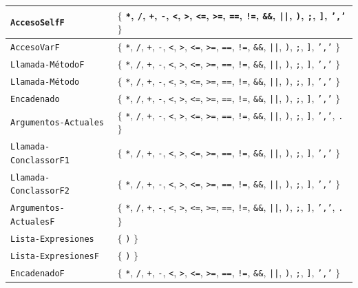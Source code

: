 \begin{longtable}{|
>{\raggedright\arraybackslash}p{}|
>{\raggedright\arraybackslash}p{}|}
\texttt{AccesoSelfF} & \(\{\) \texttt{*}, \texttt{/}, \texttt{+}, \texttt{-}, \texttt{<}, \texttt{>}, \texttt{<=}, \texttt{>=}, \texttt{==}, \texttt{!=}, \texttt{\&\&}, \texttt{||}, \texttt{)}, \texttt{;}, \texttt{]}, \texttt{','} \(\}\) \\ \hline
\texttt{AccesoVarF} & \(\{\) \texttt{*}, \texttt{/}, \texttt{+}, \texttt{-}, \texttt{<}, \texttt{>}, \texttt{<=}, \texttt{>=}, \texttt{==}, \texttt{!=}, \texttt{\&\&}, \texttt{||}, \texttt{)}, \texttt{;}, \texttt{]}, \texttt{','} \(\}\) \\ \hline
\texttt{Llamada-MétodoF} & \(\{\) \texttt{*}, \texttt{/}, \texttt{+}, \texttt{-}, \texttt{<}, \texttt{>}, \texttt{<=}, \texttt{>=}, \texttt{==}, \texttt{!=}, \texttt{\&\&}, \texttt{||}, \texttt{)}, \texttt{;}, \texttt{]}, \texttt{','} \(\}\) \\ \hline
\texttt{Llamada-Método} & \(\{\) \texttt{*}, \texttt{/}, \texttt{+}, \texttt{-}, \texttt{<}, \texttt{>}, \texttt{<=}, \texttt{>=}, \texttt{==}, \texttt{!=}, \texttt{\&\&}, \texttt{||}, \texttt{)}, \texttt{;}, \texttt{]}, \texttt{','} \(\}\) \\ \hline
\texttt{Encadenado} & \(\{\) \texttt{*}, \texttt{/}, \texttt{+}, \texttt{-}, \texttt{<}, \texttt{>}, \texttt{<=}, \texttt{>=}, \texttt{==}, \texttt{!=}, \texttt{\&\&}, \texttt{||}, \texttt{)}, \texttt{;}, \texttt{]}, \texttt{','} \(\}\) \\ \hline
\texttt{Argumentos-Actuales} & \(\{\) \texttt{*}, \texttt{/}, \texttt{+}, \texttt{-}, \texttt{<}, \texttt{>}, \texttt{<=}, \texttt{>=}, \texttt{==}, \texttt{!=}, \texttt{\&\&}, \texttt{||}, \texttt{)}, \texttt{;}, \texttt{]}, \texttt{','}, \texttt{.} \(\}\) \\ \hline
\texttt{Llamada-ConclassorF1} & \(\{\) \texttt{*}, \texttt{/}, \texttt{+}, \texttt{-}, \texttt{<}, \texttt{>}, \texttt{<=}, \texttt{>=}, \texttt{==}, \texttt{!=}, \texttt{\&\&}, \texttt{||}, \texttt{)}, \texttt{;}, \texttt{]}, \texttt{','} \(\}\) \\ \hline
\texttt{Llamada-ConclassorF2} & \(\{\) \texttt{*}, \texttt{/}, \texttt{+}, \texttt{-}, \texttt{<}, \texttt{>}, \texttt{<=}, \texttt{>=}, \texttt{==}, \texttt{!=}, \texttt{\&\&}, \texttt{||}, \texttt{)}, \texttt{;}, \texttt{]}, \texttt{','} \(\}\) \\ \hline
\texttt{Argumentos-ActualesF} & \(\{\) \texttt{*}, \texttt{/}, \texttt{+}, \texttt{-}, \texttt{<}, \texttt{>}, \texttt{<=}, \texttt{>=}, \texttt{==}, \texttt{!=}, \texttt{\&\&}, \texttt{||}, \texttt{)}, \texttt{;}, \texttt{]}, \texttt{','}, \texttt{.} \(\}\) \\ \hline
\texttt{Lista-Expresiones} & \(\{\) \texttt{)} \(\}\) \\ \hline
\texttt{Lista-ExpresionesF} & \(\{\) \texttt{)} \(\}\) \\ \hline
\texttt{EncadenadoF} & \(\{\) \texttt{*}, \texttt{/}, \texttt{+}, \texttt{-}, \texttt{<}, \texttt{>}, \texttt{<=}, \texttt{>=}, \texttt{==}, \texttt{!=}, \texttt{\&\&}, \texttt{||}, \texttt{)}, \texttt{;}, \texttt{]}, \texttt{','} \(\}\) \\ \hline
\end{longtable}
\endgroup
